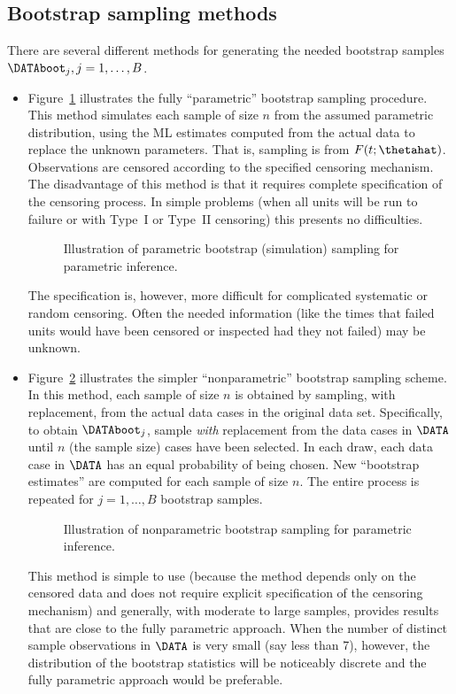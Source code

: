 \subsection{Bootstrap sampling methods}
There are several different methods for generating the needed bootstrap
samples $\DATAboot_{j}, j=1,\dots,B$. 
\begin{itemize}
\item

Figure~\ref{figure:parboot1fig.ps} illustrates the fully ``parametric''
bootstrap sampling procedure. This method simulates 
each sample of size $n$ from the assumed
parametric distribution, using the ML estimates computed from the
actual data to replace the unknown parameters. That is, sampling is
from $F(t;\thetahat)$. Observations are
censored according to the specified censoring mechanism. The
disadvantage of this method is that it requires complete
specification of the censoring process.  In simple problems (when
all units will be run to failure or with Type~I or Type~II
censoring) this presents no difficulties.
\begin{figure}
\caption{Illustration of parametric bootstrap (simulation) sampling
for parametric inference.}
\label{figure:parboot1fig.ps}
\end{figure}
The specification is, however, more difficult for complicated
systematic or random censoring. Often the needed information (like the
times that failed units would have been censored or inspected had they
not failed) may be unknown.

\item
Figure~\ref{figure:parboot2fig.ps} illustrates the simpler
``nonparametric'' bootstrap sampling scheme. In this method, each
sample of size $n$ is obtained by sampling, with replacement, from
the actual data cases in the original data set.  Specifically, to
obtain $\DATAboot_{j}$, sample {\em with} replacement from the data
cases in $\DATA$ until $n$ (the sample size) cases have been
selected. In each draw, each data case in $\DATA$ has an equal
probability of being chosen. New ``bootstrap estimates'' are
computed for each sample of size $n$. The entire process is repeated
for $j=1, \ldots, B$ bootstrap samples.
\begin{figure}
\caption{Illustration of nonparametric bootstrap sampling
for parametric inference.}
\label{figure:parboot2fig.ps}
\end{figure}
This method is simple to use (because the method depends only on the
censored data and does not require explicit specification of the
censoring mechanism) and generally, with moderate to large samples,
provides results that are close to the fully parametric approach.
When the number of distinct sample observations in $\DATA$ is very
small (say less than 7), however, the distribution of the bootstrap
statistics will be noticeably discrete and the fully parametric
approach would be preferable.
\end{itemize}
